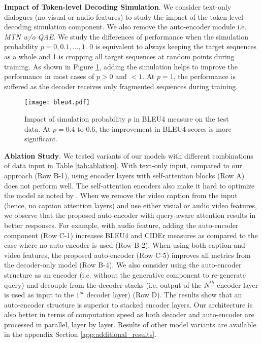 \documentclass[11pt,a4paper]{article}
\begin{document}
\noindent\textbf{Impact of Token-level Decoding Simulation}. We consider text-only dialogues (no visual or audio features) to study the impact of the token-level decoding simulation component. We also remove the auto-encoder module i.e. \textit{MTN w/o QAE}. We study the differences of performance when the simulation probability $p={0,0.1,...,1}$. 0 is equivalent to always keeping the target sequences as a whole and 1 is cropping all target sequences at random points during training. As shown in Figure \ref{fig:sim_prob}, adding the simulation helps to improve the performance in most cases of $p>0$ and $<1$. 
At $p=1$, the performance is suffered as the decoder receives only fragmented sequences during training. 


\begin{figure}[htbp]
	\centering
	\texttt{[image: bleu4.pdf]}
	\caption{Impact of simulation probability $p$ in BLEU4 measure on the test data. At $p=0.4$ to $0.6$, the improvement in BLEU4 scores is more significant.}
	\label{fig:sim_prob}
\end{figure}

\noindent\textbf{Ablation Study}. We tested variants of our models with different combinations of data input in Table \ref{tab:ablation}. With text-only input, compared to our approach (Row B-1), using encoder layers with self-attention blocks (Row A) does not perform well. 
The self-attention encoders also make it hard to optimize the model as noted by \cite{liu2018generating}. When we remove the video caption from the input (hence, no caption attention layers) and use either visual or audio video features, we observe that the proposed auto-encoder with query-aware attention results in better responses. For example, with audio feature, adding the auto-encoder component (Row C-1) increases BLEU4 and CIDEr measures as compared to the case where no auto-encoder is used (Row B-2). When using both caption and video features, the proposed auto-encoder (Row C-5) improves all metrics from the decoder-only model (Row B-4). We also consider using the auto-encoder structure as an encoder (i.e. without the generative component to re-generate query) and decouple from the decoder stacks (i.e. output of the $N^{th}$ encoder layer is used as input to the $1^{st}$ decoder layer) (Row D). The results show that an auto-encoder structure is superior to stacked encoder layers. Our architecture is also better in terms of computation speed as both decoder and auto-encoder are processed in parallel, layer by layer. Results of other model variants are available in the appendix Section \ref{app:additional_results}. 
\end{document}
